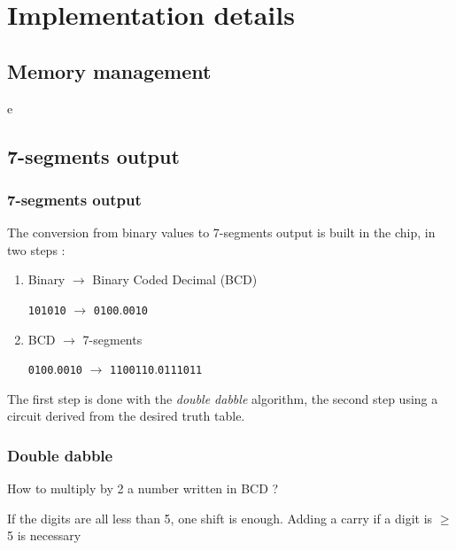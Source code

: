 \documentclass[slidestop]{beamer}
\begin{document}
\section{Implementation details}

\subsection{Memory management}

\begin{frame}
e
\end{frame}

\subsection{7-segments output}

\begin{frame}
\frametitle{7-segments output}
The conversion from binary values to 7-segments output is built in the chip, in two steps :
\begin{enumerate}
    \item Binary $\rightarrow$ Binary Coded Decimal (BCD)
        
          \texttt{101010} $\rightarrow$ \texttt{0100}.\texttt{0010}
    \item BCD $\rightarrow$ 7-segments

        \texttt{0100}.\texttt{0010} $\rightarrow$ \texttt{1100110}.\texttt{0111011}
\end{enumerate}

The first step is done with the \emph{double dabble} algorithm, the second step using a circuit derived
from the desired truth table.

\end{frame}

\begin{frame}
    \frametitle{Double dabble}

    How to multiply by 2 a number written in BCD ?

    If the digits are all less than 5, one shift is enough.
    Adding a carry if a digit is $\geq$ 5 is necessary
\end{frame}
\end{document}
